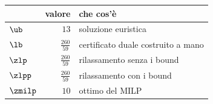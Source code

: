 \begin{center}\small
\begin{tabular}{lrl}
\toprule
 & valore & che cos'è \\
\midrule
$\ub$ & $13$ & soluzione euristica \\
$\lb$ & $\frac{260}{59}$ & certificato duale costruito a mano \\
$\zlp$ & $\frac{260}{59}$ & rilassamento senza i bound \\
$\zlpp$ & $\frac{260}{59}$ & rilassamento con i bound \\
$\zmilp$ & $10$ & ottimo del MILP \\
\bottomrule
\end{tabular}
\end{center}
